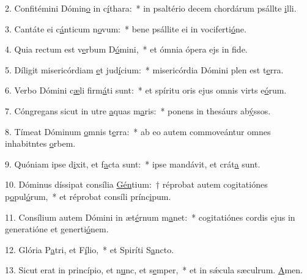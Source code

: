 2. Confitémini Dómin\uline{o} in c\uline{í}thara:~* in psaltério decem chordárum psállte \uline{i}lli.\par 
3. Cantáte ei c\uline{á}nticum n\uline{o}vum:~* bene psállite ei in vociferti\uline{ó}ne.\par 
4. Quia rectum est v\uline{e}rbum D\uline{ó}mini,~* et ómnia ópera ejs in f\uline{i}de.\par 
5. Díligit misericórdiam \uline{e}t jud\uline{í}cium:~* misericórdia Dómini plen est t\uline{e}rra.\par 
6. Verbo Dómini c\uline{æ}li firm\uline{á}ti sunt:~* et spíritu oris ejus omnis virts e\uline{ó}rum.\par 
7. Cóngregans sicut in utre \uline{a}quas m\uline{a}ris:~* ponens in thesáurs ab\uline{ý}ssos.\par 
8. Tímeat Dóminum \uline{o}mnis t\uline{e}rra:~* ab eo autem commoveántur omnes inhabitntes \uline{o}rbem.\par 
9. Quóniam ipse d\uline{i}xit, et f\uline{a}cta sunt:~* ipse mandávit, et crát\uline{a} sunt.\par 
10. Dóminus díssipat consília \uline{Gén}tium:~† réprobat autem cogitatiónes p\uline{o}pul\uline{ó}rum,~* et réprobat consíli prínc\uline{i}pum.\par 
11. Consílium autem Dómini in æt\uline{é}rnum m\uline{a}net:~* cogitatiónes cordis ejus in generatióne et generti\uline{ó}nem.\par 
12. Glória P\uline{a}tri, et F\uline{í}lio,~* et Spiríti S\uline{a}ncto.\par 
13. Sicut erat in princípio, et n\uline{u}nc, et s\uline{e}mper,~* et in sǽcula sæculrum. \uline{A}men.\par 
